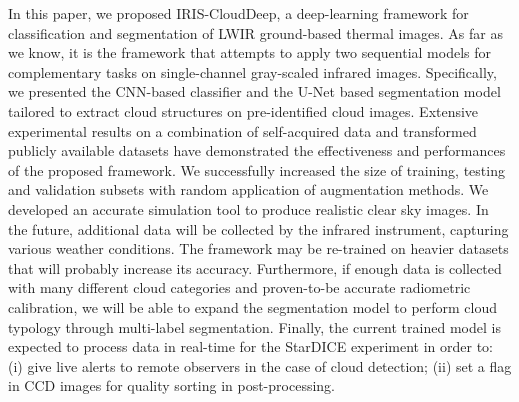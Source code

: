 \documentclass[amt, article]{copernicus}
\begin{document}
In this paper, we proposed IRIS-CloudDeep, a deep-learning framework for classification and segmentation of LWIR
ground-based thermal images. As far as we know, it is the framework that attempts to apply two sequential models for complementary tasks on single-channel gray-scaled infrared images. Specifically, we presented the CNN-based classifier and the U-Net based segmentation model tailored to extract cloud structures on pre-identified cloud images. Extensive experimental results on a combination of self-acquired data and transformed publicly available datasets have demonstrated
the effectiveness and performances of the proposed framework. We successfully increased the size of training, testing and validation subsets with random application of augmentation methods. We developed an accurate simulation tool to produce realistic clear sky images. In the future, additional data will be collected by the infrared instrument, capturing various weather conditions. The framework may be re-trained on heavier datasets that will probably increase its accuracy.  Furthermore, if enough data is collected with many different cloud categories and proven-to-be accurate radiometric calibration, we will be able to expand the segmentation model to perform cloud typology through multi-label segmentation. Finally, the current trained model is expected to process data in real-time for the StarDICE experiment in order to: (i) give live alerts to remote observers in the case of cloud detection; (ii) set a flag in CCD images for quality sorting in post-processing.








\end{document}
